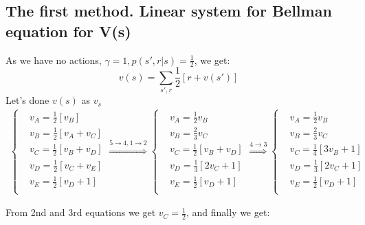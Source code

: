 \documentclass[12pt]{article}
\begin{document}
        \subsection*{The first method. Linear system for Bellman equation for V(s)}
        As we have no actions, $\gamma = 1, p(s',r|s)=\frac{1}{2}$, we get:
        $$v(s) = \sum\limits_{s',r}\frac{1}{2}[r + v(s')]$$
        Let's done $v(s)$ as $v_s$
        \begin{align*}
        \begin{cases}
            &v_A = \frac{1}{2}[v_B]\\
            &v_B = \frac{1}{2}[v_A + v_C]\\
            &v_C = \frac{1}{2}[v_B + v_D]\\
            &v_D = \frac{1}{2}[v_C + v_E]\\
            &v_E = \frac{1}{2}[v_D + 1]\\
        \end{cases}
        \overset{5 \rightarrow 4, 1 \rightarrow 2}{\Longrightarrow}
        \begin{cases}
            &v_A = \frac{1}{2}v_B\\
            &v_B = \frac{2}{3}v_C\\
            &v_C = \frac{1}{2}[v_B + v_D]\\
            &v_D = \frac{1}{3}[2v_C + 1]\\
            &v_E = \frac{1}{2}[v_D + 1]\\
        \end{cases}
        \overset{4 \rightarrow 3}{\Longrightarrow}
        \begin{cases}
            &v_A = \frac{1}{2}v_B\\
            &v_B = \frac{2}{3}v_C\\
            &v_C = \frac{1}{4}[3v_B + 1]\\
            &v_D = \frac{1}{3}[2v_C + 1]\\
            &v_E = \frac{1}{2}[v_D + 1]\\
        \end{cases}
        \end{align*}

        From 2nd and 3rd equations we get $v_C = \frac{1}{2}$, and finally we
        get:
\end{document}
